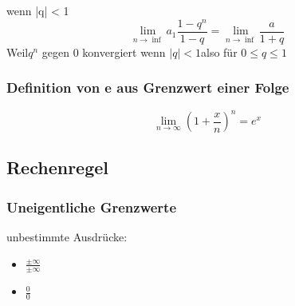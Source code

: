 \begin{definition}
     wenn |q| < 1
    \begin{equation}
       \lim_{n \rightarrow \inf} a_1 \frac{1-q^n}{1-q} = \lim_{n \rightarrow \inf} \frac{a}{1+q}
    \end{equation}
    Weil$ q^n$ gegen 0 konvergiert wenn $|q| < 1 $also für $0 \le q \le 1$
\end{definition}

\subsubsection{Definition von e aus Grenzwert einer Folge}
\[
 \lim_{n \to \infty} \left(1 + \frac{x}{n}\right)^n = e^x 
\]
\subsection{Rechenregel}

\subsubsection{Uneigentliche Grenzwerte}

\begin{theorem}
    unbestimmte Ausdrücke:
    \begin{itemize}
        \item $\frac{\pm \infty}{\pm \infty}$
        \item $\frac{0}{0}$
    \end{itemize}
\end{theorem}